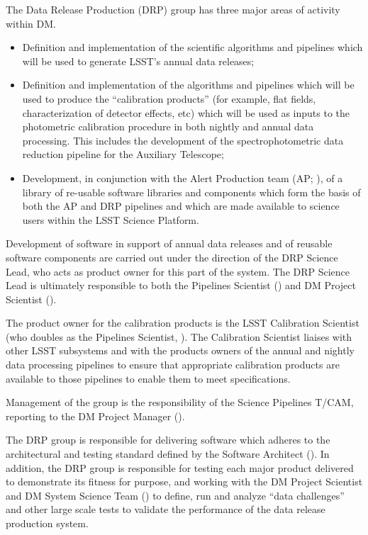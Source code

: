 The Data Release Production (DRP) group has three major areas of activity within DM.

\begin{itemize}

  \item{Definition and implementation of the scientific algorithms and pipelines which will be used to generate LSST's annual data releases;}

  \item{Definition and implementation of the algorithms and pipelines which will be used to produce the ``calibration products'' (for example, flat fields, characterization of detector effects, etc) which will be used as inputs to the photometric calibration procedure in both nightly and annual data processing. This includes the development of the spectrophotometric data reduction pipeline for the Auxiliary Telescope;}

  \item{Development, in conjunction with the Alert Production team (AP; ), of a library of re-usable software libraries and components which form the basis of both the AP and DRP pipelines and which are made available to science users within the LSST Science Platform.}

\end{itemize}

Development of software in support of annual data releases and of reusable software components are carried out under the direction of the DRP Science Lead, who acts as product owner for this part of the system.
The DRP Science Lead is ultimately responsible to both the Pipelines Scientist () and DM Project Scientist ().

The product owner for the calibration products is the LSST Calibration Scientist (who doubles as the Pipelines Scientist, ).
The Calibration Scientist liaises with other LSST subsystems and with the products owners of the annual and nightly data processing pipelines to ensure that appropriate calibration products are available to those pipelines to enable them to meet specifications.

Management of the group is the responsibility of the Science Pipelines T/CAM, reporting to the DM Project Manager ().

The DRP group is responsible for delivering software which adheres to the architectural and testing standard defined by the Software Architect ().
In addition, the DRP group is responsible for testing each major product delivered to demonstrate its fitness for purpose, and working with the DM Project Scientist and DM System Science Team () to define, run and analyze ``data challenges'' and other large scale tests to validate the performance of the data release production system.

